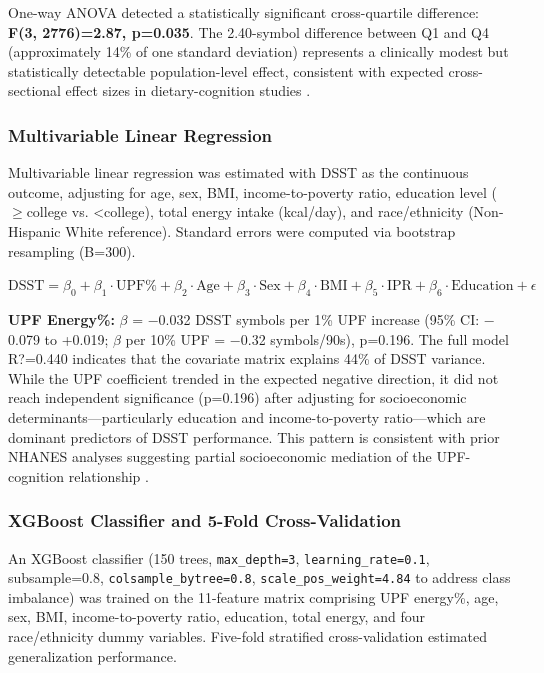 \documentclass[journal,twoside,10pt]{IEEEtran}
\begin{document}
One-way ANOVA detected a statistically significant cross-quartile difference: \textbf{F(3, 2776)=2.87, p=0.035}. The 2.40-symbol difference between Q1 and Q4 (approximately 14\% of one standard deviation) represents a clinically modest but statistically detectable population-level effect, consistent with expected cross-sectional effect sizes in dietary-cognition studies \cite{ref18,ref22}.

\subsubsection{Multivariable Linear Regression}

Multivariable linear regression was estimated with DSST as the continuous outcome, adjusting for age, sex, BMI, income-to-poverty ratio, education level ($\geq$college vs. <college), total energy intake (kcal/day), and race/ethnicity (Non-Hispanic White reference). Standard errors were computed via bootstrap resampling (B=300).

$\text{DSST} = \beta_0 + \beta_1 \cdot \text{UPF\%} + \beta_2 \cdot \text{Age} + \beta_3 \cdot \text{Sex} + \beta_4 \cdot \text{BMI} + \beta_5 \cdot \text{IPR} + \beta_6 \cdot \text{Education} + \epsilon$

\textbf{UPF Energy\%:} $\beta$ = $-$0.032 DSST symbols per 1\% UPF increase (95\% CI: $-$0.079 to +0.019; $\beta$ per 10\% UPF = $-$0.32 symbols/90s), p=0.196. The full model R?=0.440 indicates that the covariate matrix explains 44\% of DSST variance. While the UPF coefficient trended in the expected negative direction, it did not reach independent significance (p=0.196) after adjusting for socioeconomic determinants---particularly education and income-to-poverty ratio---which are dominant predictors of DSST performance. This pattern is consistent with prior NHANES analyses suggesting partial socioeconomic mediation of the UPF-cognition relationship \cite{ref18,ref22}.

\subsubsection{XGBoost Classifier and 5-Fold Cross-Validation}

An XGBoost classifier (150 trees, \texttt{max\_depth=3}, \texttt{learning\_rate=0.1}, subsample=0.8, \texttt{colsample\_bytree=0.8}, \texttt{scale\_pos\_weight=4.84} to address class imbalance) was trained on the 11-feature matrix comprising UPF energy\%, age, sex, BMI, income-to-poverty ratio, education, total energy, and four race/ethnicity dummy variables. Five-fold stratified cross-validation estimated generalization performance.
\end{document}
